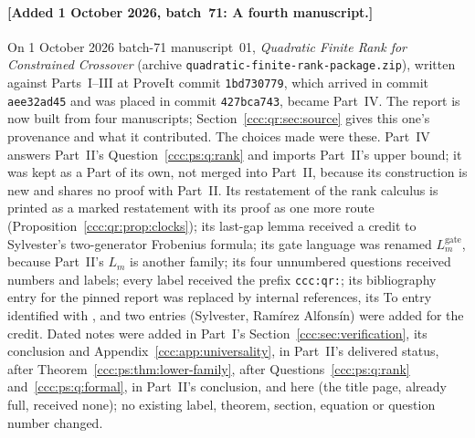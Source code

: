 \documentclass[11pt,letterpaper]{article}
\theoremstyle{definition}
\theoremstyle{remark}
\newcommand{\waddsevone}[1]{\textup{[}Added 1 October 2026, batch~71: #1\textup{]}}
\newcommand{\Lgate}[1]{L^{\mathrm{gate}}_{#1}}
\begin{document}
\paragraph{\waddsevone{A fourth manuscript.}} On 1 October 2026 batch-71
manuscript~01, \emph{Quadratic Finite Rank for Constrained Crossover}
(archive \texttt{quadratic-finite-rank-package.zip}), written against
Parts~I--III at ProveIt commit \texttt{1bd730779}, which arrived in commit
\texttt{aee32ad45} and was placed in commit \texttt{427bca743}, became
Part~IV. The report is now built from four manuscripts;
Section~\ref{ccc:qr:sec:source} gives this one's provenance and what it
contributed. The choices made were these. Part~IV answers Part~II's
Question~\ref{ccc:ps:q:rank} and imports Part~II's upper bound; it was kept
as a Part of its own, not merged into Part~II, because its construction is
new and shares no proof with Part~II. Its restatement of the rank calculus
is printed as a marked restatement with its proof as one more route
(Proposition~\ref{ccc:qr:prop:clocks}); its last-gap lemma received a
credit to Sylvester's two-generator Frobenius formula; its gate language was
renamed $\Lgate m$, because Part~II's $L_m$ is another family; its four
unnumbered questions received numbers and labels; every label received the
prefix \texttt{ccc:qr:}; its bibliography entry for the pinned report was
replaced by internal references, its To entry identified with \cite{To},
and two entries (Sylvester, Ram\'irez Alfons\'in) were added for the credit.
Dated notes were added in Part~I's
Section~\ref{ccc:sec:verification}, its conclusion and
Appendix~\ref{ccc:app:universality}, in Part~II's delivered status, after
Theorem~\ref{ccc:ps:thm:lower-family}, after
Questions~\ref{ccc:ps:q:rank} and~\ref{ccc:ps:q:formal}, in Part~II's
conclusion, and here (the title page, already full, received none); no
existing label, theorem, section, equation or
question number changed.
\end{document}
